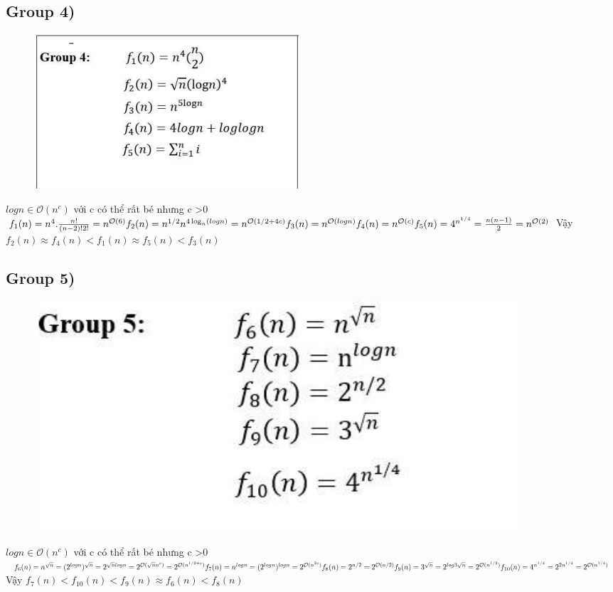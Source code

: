 \documentclass[10pt,a4paper]{article}
\begin{document}
\subsection*{Group 4)}
\begin{figure}[H]
    \centering
    \includegraphics[scale=1]{images/4.4.png}
\end{figure}
$logn \in \mathcal{O}(n^c)$ với c có thể rất bé nhưng c >0\\
$f_1(n) = n^4.\frac{n!}{(n-2)!2!} = n^{\mathcal{O}(6)}\\
f_2(n) = n^{1/2}n^{4\log_n(logn)} = n^{\mathcal{O}(1/2 + 4c)}\\
f_3(n) =  n^{\mathcal{O}(logn )}\\
f_4(n) =  n^{\mathcal{O}(c)}\\
f_{5}(n) = 4^{n^{1/4}} = \frac{n(n-1)}{2} = n^{\mathcal{O}(2)}\\
$
Vậy $f_2(n) \approx f_4(n) < f_{1}(n) \approx f_5(n)  < f_3(n)$
\subsection*{Group 5)}
\begin{figure}[H]
    \centering
    \includegraphics[scale=1]{images/4.5.png}
\end{figure}
$logn \in \mathcal{O}(n^c)$ với c có thể rất bé nhưng c >0\\
$f_6(n) = n^{\sqrt{n}} = (2^{logn})^{\sqrt{n}} = 2^{\sqrt{n}logn} = 2^{\mathcal{O}(\sqrt{n}n^c)} = 2^{\mathcal{O}(n^{1/2 + c})}\\
f_7(n) = n^{logn} = (2^{logn})^{logn} = 2^{\mathcal{O}(n^{2c})}\\
f_8(n) = 2^{n/2} =  2^{\mathcal{O}(n/2)}\\
f_9(n) = 3^{\sqrt{n}} = 2^{log3\sqrt{n}} = 2^{\mathcal{O}(n^{1/2})}\\
f_{10}(n) = 4^{n^{1/4}} = 2^{2n^{1/4}} = 2^{\mathcal{O}(n^{1/4})}\\
$
Vậy $f_7(n) < f_{10}(n) < f_9(n) \approx f_6(n) < f_8(n)$
\end{document}

